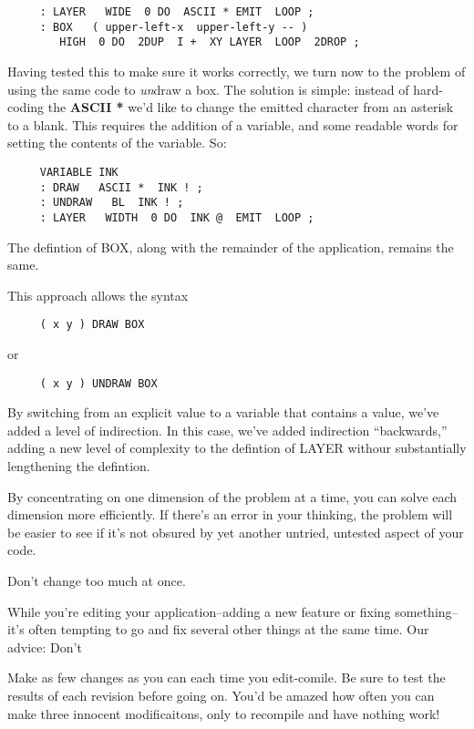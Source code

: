 \begin{verbatim}
     : LAYER   WIDE  0 DO  ASCII * EMIT  LOOP ;
     : BOX   ( upper-left-x  upper-left-y -- )
        HIGH  0 DO  2DUP  I +  XY LAYER  LOOP  2DROP ;
\end{verbatim}
Having tested this to make sure it works correctly, we turn now to the problem of using the same code to \textit{un}draw a box. The solution is simple: instead of hard-coding the \textbf{ASCII *} we'd like to change the emitted character from an asterisk to a blank. This requires the addition of a variable, and some readable words for setting the contents of the variable. So:

\begin{verbatim}
     VARIABLE INK
     : DRAW   ASCII *  INK ! ;
     : UNDRAW   BL  INK ! ;
     : LAYER   WIDTH  0 DO  INK @  EMIT  LOOP ;
\end{verbatim}
The defintion of BOX, along with the remainder of the application, remains the same.

This approach allows the syntax

\begin{verbatim}
     ( x y ) DRAW BOX
\end{verbatim}
or

\begin{verbatim}
     ( x y ) UNDRAW BOX
\end{verbatim}
By switching from an explicit value to a variable that contains a value, we've added a level of indirection. In this case, we've added indirection ``backwards,'' adding a new level of complexity to the defintion of LAYER withour substantially lengthening the defintion.

By concentrating on one dimension of the problem at a time, you can solve each dimension more efficiently. If there's an error in your thinking, the problem will be easier to see if it's not obsured by yet another untried, untested aspect of your code.

\begin{tip}
Don't change too much at once.
\end{tip}
While you're editing your application--adding a new feature or fixing something--it's often tempting to go and fix several other things at the same time. Our advice: Don't

Make as few changes as you can each time you edit-comile. Be sure to test the results of each revision before going on. You'd be amazed how often you can make three innocent modificaitons, only to recompile and have nothing work!

